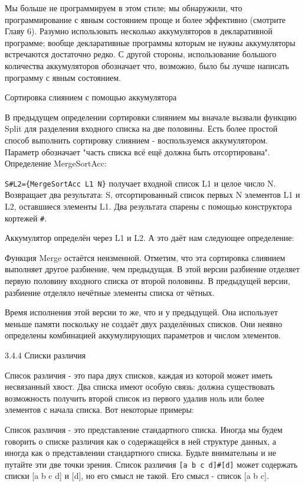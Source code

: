 Мы больше не программируем в этом стиле; мы обнаружили, что программирование с явным состоянием проще и более эффективно (смотрите Главу 6). Разумно использовать несколько аккумуляторов в декларативной программе; вообще декларативные программы которым не нужны аккумуляторы встречаются достаточно редко. С другой стороны, использование большого количества аккумуляторов обозначает что, возможно, было бы лучше написать программу с явным состоянием.

Сортировка слиянием с помощью аккумулятора

В предыдущем определении сортировки слиянием мы вначале вызвали функцию Split для разделения входного списка на две половины. Есть более простой способ выполнить сортировку слиянием - воспользуемся аккумулятором. Параметр обозначает "часть списка всё ещё должна быть отсортирована". Определение MergeSortAcc:

\verb|S#L2={MergeSortAcc L1 N}| получает входной список L1 и целое число N. Возвращает два результата: S, отсортированный список первых N элементов L1 и L2, оставшиеся элементы L1. Два результата спарены с помощью конструктора кортежей \verb|#|.

Аккумулятор определён через L1 и L2. А это даёт нам следующее определение:

Функция Merge остаётся неизменной. Отметим, что эта сортировка слиянием выполняет другое разбиение, чем предыдущая. В этой версии разбиение отделяет первую половину входного списка от второй половины. В предыдущей версии, разбиение отделяло нечётные элементы списка от чётных.

Время исполнения этой версии то же, что и у предыдущей. Она использует меньше памяти поскольку не создаёт двух разделённых списков. Они неявно определены комбинацией аккумулирующих параметров и числом элементов.

3.4.4 Списки различия

Список различия - это пара двух списков, каждая из которой может иметь несвязанный хвост. Два списка имеют особую связь: должна существовать возможность получить второй список из первого удалив ноль или более элементов с начала списка. Вот некоторые примеры:


Список различия - это представление стандартного списка. Иногда мы будем говорить о списке различия как о содержащейся в ней структуре данных, а иногда как о представлении стандартного списка. Будьте внимательны и не путайте эти две точки зрения. Список различия \verb|[a b c d]#[d]| может содержать списки [a b c d] и [d], но его смысл не такой. Его смысл - список [a b c].

